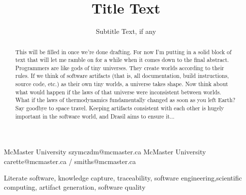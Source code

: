 \documentclass[preprint, 10pt]{sigplanconf}
\begin{document}
\setlength{\pdfpageheight}{\paperheight}
\setlength{\pdfpagewidth}{\paperwidth}




\title{Title Text}
\subtitle{Subtitle Text, if any}

           {McMaster University}
           {szymczdm@mcmaster.ca}
           {McMaster University}
           {carette@mcmaster.ca / smiths@mcmaster.ca}

\maketitle

\begin{abstract}
This will be filled in once we're done drafting. For now I'm putting in a solid
block of text that will let me ramble on for a while when it comes down to the
final abstract. Programmers are like gods of tiny universes. They create worlds
according to their rules. If we think of software artifacts (that is, all
documentation, build instructions, source code, etc.) as their own tiny worlds,
a universe takes shape. Now think about what would happen if the laws of that
universe were inconsistent between worlds. What if the laws of thermodynamics
fundamentally changed as soon as you left Earth? Say goodbye to space travel.
Keeping artifacts consistent with each other is hugely important in the software
world, and Drasil aims to ensure it...
\end{abstract}



\keywords
Literate software, knowledge capture, traceability, software engineering,scientific 
computing, artifact generation, software quality
\end{document}
